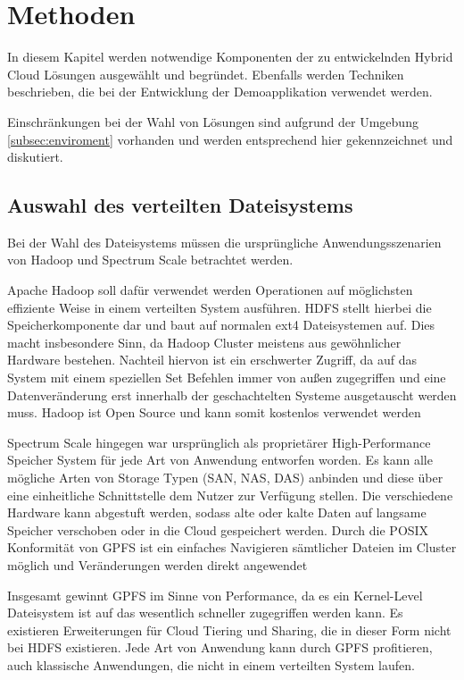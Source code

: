 \chapter{Methoden}\label{ch:methods}

In diesem Kapitel werden notwendige Komponenten der zu entwickelnden Hybrid Cloud Lösungen ausgewählt und begründet. Ebenfalls werden Techniken beschrieben, die bei der Entwicklung der Demoapplikation verwendet werden. 

Einschränkungen bei der Wahl von Lösungen sind aufgrund der Umgebung \ref{subsec:enviroment} vorhanden und werden entsprechend hier gekennzeichnet und diskutiert.

\section{Auswahl des verteilten Dateisystems}
Bei der Wahl des Dateisystems müssen die ursprüngliche Anwendungsszenarien von Hadoop und Spectrum Scale betrachtet werden. 

Apache Hadoop soll dafür verwendet werden Operationen auf möglichsten effiziente Weise in einem verteilten System ausführen. \acs{HDFS} stellt hierbei die Speicherkomponente dar und baut auf normalen ext4 Dateisystemen auf. Dies macht insbesondere Sinn, da Hadoop Cluster meistens aus gewöhnlicher Hardware bestehen. Nachteil hiervon ist ein erschwerter Zugriff, da auf das System mit einem speziellen Set Befehlen immer von außen zugegriffen und eine Datenveränderung erst innerhalb der geschachtelten Systeme ausgetauscht werden muss.
Hadoop ist Open Source und kann somit kostenlos verwendet werden %

Spectrum Scale hingegen war ursprünglich als proprietärer High-Performance Speicher System für jede Art von Anwendung entworfen worden. Es kann alle mögliche Arten von Storage Typen (\acs{SAN}, \acs{NAS}, \acs{DAS}) anbinden und diese über eine einheitliche Schnittstelle dem Nutzer zur Verfügung stellen. Die verschiedene Hardware kann abgestuft werden, sodass alte oder kalte Daten auf langsame Speicher verschoben oder in die Cloud gespeichert werden.  Durch die \gls{POSIX} Konformität von \acs{GPFS} ist ein einfaches Navigieren sämtlicher Dateien im Cluster möglich und Veränderungen werden direkt angewendet %

Insgesamt gewinnt \acs{GPFS} im Sinne von Performance, da es ein Kernel-Level Dateisystem ist auf das wesentlich schneller zugegriffen werden kann. Es existieren Erweiterungen für Cloud Tiering und Sharing, die in dieser Form nicht bei HDFS existieren. Jede Art von Anwendung kann durch \acs{GPFS} profitieren, auch klassische Anwendungen, die nicht in einem verteilten System laufen.

